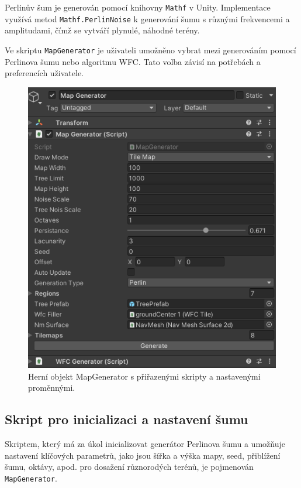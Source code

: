 Perlinův šum je generován pomocí knihovny \texttt{Mathf} v Unity. Implementace využívá metod \texttt{Mathf.PerlinNoise} k generování šumu s různými frekvencemi a amplitudami, čímž se vytváří plynulé, náhodné terény.

Ve skriptu \texttt{MapGenerator} je uživateli umožněno vybrat mezi generováním pomocí Perlinova šumu nebo algoritmu WFC. Tato volba závisí na potřebách a preferencích uživatele.

\begin{figure}[H]
	\centering
	\includegraphics[scale=1]{obrazky-figures/MapGeneratorVariables.png}
	\caption{Herní objekt MapGenerator s přiřazenými skripty a nastavenými proměnnými.}
	\label{fig:MapGeneratorVariables}
\end{figure}

\subsection{Skript pro inicializaci a nastavení šumu}
Skriptem, který má za úkol inicializovat generátor Perlinova šumu a umožňuje nastavení klíčových parametrů, jako jsou šířka a výška mapy, seed, přiblížení šumu, oktávy, apod. pro dosažení různorodých terénů, je pojmenován \texttt{MapGenerator}. 

